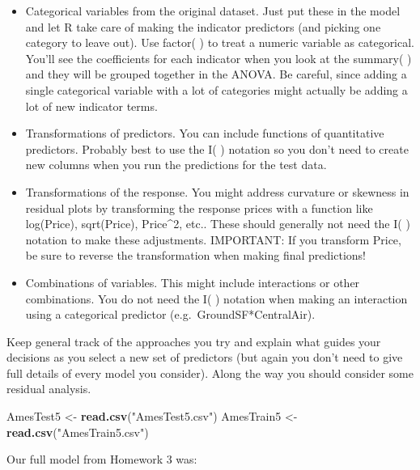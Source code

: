 \documentclass[
]{article}
\newenvironment{Shaded}{\begin{snugshade}}{\end{snugshade}}
\newcommand{\KeywordTok}[1]{\textcolor[rgb]{0.13,0.29,0.53}{\textbf{#1}}}
\newcommand{\NormalTok}[1]{#1}
\newcommand{\StringTok}[1]{\textcolor[rgb]{0.31,0.60,0.02}{#1}}
\begin{document}
\begin{itemize}
\item
  Categorical variables from the original dataset. Just put these in the
  model and let R take care of making the indicator predictors (and
  picking one category to leave out). Use factor( ) to treat a numeric
  variable as categorical. You'll see the coefficients for each
  indicator when you look at the summary( ) and they will be grouped
  together in the ANOVA. Be careful, since adding a single categorical
  variable with a lot of categories might actually be adding a lot of
  new indicator terms.
\item
  Transformations of predictors. You can include functions of
  quantitative predictors. Probably best to use the I( ) notation so you
  don't need to create new columns when you run the predictions for the
  test data.
\item
  Transformations of the response. You might address curvature or
  skewness in residual plots by transforming the response prices with a
  function like log(Price), sqrt(Price), Price\^{}2, etc.. These should
  generally not need the I( ) notation to make these adjustments.
  IMPORTANT: If you transform Price, be sure to reverse the
  transformation when making final predictions!
\item
  Combinations of variables. This might include interactions or other
  combinations. You do not need the I( ) notation when making an
  interaction using a categorical predictor (e.g.~GroundSF*CentralAir).
\end{itemize}

Keep general track of the approaches you try and explain what guides
your decisions as you select a new set of predictors (but again you
don't need to give full details of every model you consider). Along the
way you should consider some residual analysis.

\begin{Shaded}
\begin{Highlighting}[]
\NormalTok{AmesTest5 <-}\StringTok{ }\KeywordTok{read.csv}\NormalTok{(}\StringTok{"AmesTest5.csv"}\NormalTok{)}
\NormalTok{AmesTrain5 <-}\StringTok{ }\KeywordTok{read.csv}\NormalTok{(}\StringTok{"AmesTrain5.csv"}\NormalTok{)}
\end{Highlighting}
\end{Shaded}

Our full model from Homework 3 was:
\end{document}
